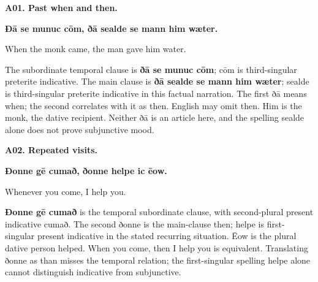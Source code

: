 \par\begin{minipage}{\linewidth}\raggedright
\textbf{A01. Past when and then.}

\textbf{Ðā se munuc cōm, ðā sealde se mann him wæter.}

When the monk came, the man gave him water.

The subordinate temporal clause is \textbf{ðā se munuc cōm}; cōm is third-singular preterite indicative. The main clause is \textbf{ðā sealde se mann him wæter}; sealde is third-singular preterite indicative in this factual narration. The first ðā means when; the second correlates with it as then. English may omit then. Him is the monk, the dative recipient. Neither ðā is an article here, and the spelling sealde alone does not prove subjunctive mood.

\end{minipage}\par\addvspace{4pt}

\par\begin{minipage}{\linewidth}\raggedright
\textbf{A02. Repeated visits.}

\textbf{Ðonne gē cumað, ðonne helpe ic ēow.}

Whenever you come, I help you.

\textbf{Ðonne gē cumað} is the temporal subordinate clause, with second-plural present indicative cumað. The second ðonne is the main-clause then; helpe is first-singular present indicative in the stated recurring situation. Ēow is the plural dative person helped. When you come, then I help you is equivalent. Translating ðonne as than misses the temporal relation; the first-singular spelling helpe alone cannot distinguish indicative from subjunctive.

\end{minipage}\par\addvspace{4pt}

